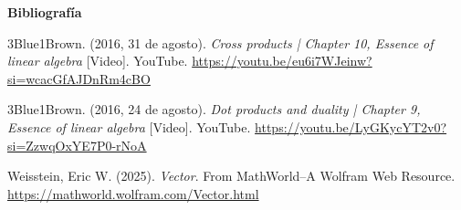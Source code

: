 \documentclass[letterpaper,11pt]{article}
\begin{document}
\bigskip
{\Large\bfseries Bibliografía}

3Blue1Brown. (2016, 31 de agosto). \textit{Cross products | Chapter 10, Essence of linear algebra} [Video]. YouTube. \href{https://youtu.be/eu6i7WJeinw?si=wcacGfAJDnRm4cBO}{https://youtu.be/eu6i7WJeinw?si=wcacGfAJDnRm4cBO}
\smallskip

3Blue1Brown. (2016, 24 de agosto). \textit{Dot products and duality | Chapter 9, Essence of linear algebra} [Video]. YouTube. \href{https://youtu.be/LyGKycYT2v0?si=ZzwqOxYE7P0-rNoA}{https://youtu.be/LyGKycYT2v0?si=ZzwqOxYE7P0-rNoA}
\smallskip

Weisstein, Eric W. (2025). \textit{Vector}. From MathWorld--A Wolfram Web Resource. \href{https://mathworld.wolfram.com/Vector.html}{https://mathworld.wolfram.com/Vector.html}
\end{document}
